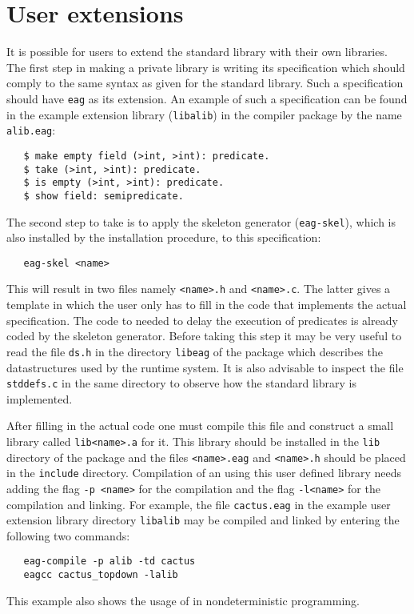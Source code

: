 \section {User extensions}
It is possible for users to extend the standard library with their
own libraries. The first step in making a private library is
writing its specification which should comply to the same syntax
as given for the standard library. Such a specification should
have {\tt eag} as its extension. An example of such a specification
can be found in the example extension library ({\tt libalib}) in the
compiler package by the name {\tt alib.eag}:
\begin{verbatim}
   $ make empty field (>int, >int): predicate.
   $ take (>int, >int): predicate.
   $ is empty (>int, >int): predicate.
   $ show field: semipredicate.
\end{verbatim}

The second step to take is to apply the skeleton generator
(\verb+eag-skel+), which is also installed by the installation
procedure, to this specification:
\begin{verbatim}
   eag-skel <name>
\end{verbatim}
This will result in two files namely \verb+<name>.h+ and
\verb+<name>.c+. The latter gives a template in which the user
only has to fill in the \C code that implements the actual
specification. The code to needed to delay the execution
of predicates is already coded by the skeleton generator. Before
taking this step it may be very useful to read the file
{\tt ds.h} in the directory {\tt libeag} of the package
which describes the datastructures used by the
\EAG runtime system. It is also advisable to inspect the file
{\tt stddefs.c} in the same directory to observe how the
standard library is implemented.

After filling in the actual code one must compile this \C file
and construct a small library called \verb+lib<name>.a+ for it.
This library should be installed in the {\tt lib} directory
of the package and the files \verb+<name>.eag+ and \verb+<name>.h+
should be placed in the {\tt include} directory. Compilation
of an \EAG using this user defined library needs adding the flag
\verb+-p <name>+ for the compilation and the flag \verb+-l<name>+
for the \C compilation and linking. For example, the file
{\tt cactus.eag} in the example user extension library
directory {\tt libalib} may be compiled and linked by entering the
following two commands:
\begin{verbatim}
   eag-compile -p alib -td cactus
   eagcc cactus_topdown -lalib
\end{verbatim}
This example also shows the usage of \EAG in nondeterministic programming.
